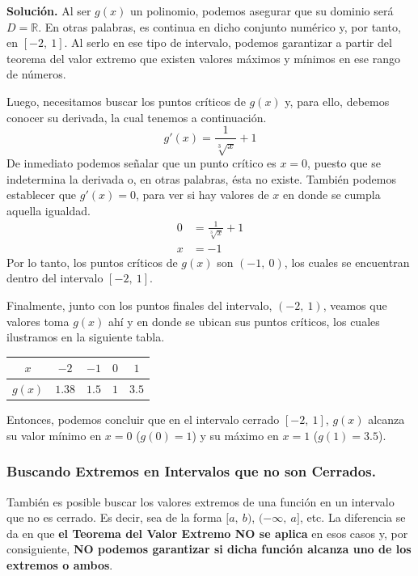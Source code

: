 \documentclass[12pt]{article}
\begin{document}
\textbf{Solución.} \quad Al ser $g(x)$ un polinomio, podemos asegurar que su dominio será $D = \mathbb{R}$. En otras palabras, es continua en dicho conjunto numérico y, por tanto, en $[-2, \ 1]$. Al serlo en ese tipo de intervalo, podemos garantizar a partir del teorema del valor extremo que existen valores máximos y mínimos en ese rango de números.

Luego, necesitamos buscar los puntos críticos de $g(x)$ y, para ello, debemos conocer su derivada, la cual tenemos a continuación.
\[
	g'(x) = \frac{1}{\sqrt[3]{x}} + 1
\]
De inmediato podemos señalar que un punto crítico es $x = 0$, puesto que se indetermina la derivada o, en otras palabras, ésta no existe. También podemos establecer que $g'(x) = 0$, para ver si hay valores de $x$ en donde se cumpla aquella igualdad.
\begin{align*}
	0 &= \frac{1}{\sqrt[3]{x}} + 1 \\
	x &= -1
\end{align*}
Por lo tanto, los puntos críticos de $g(x)$ son $(-1, \ 0)$, los cuales se encuentran dentro del intervalo $[-2, \ 1]$.

Finalmente, junto con los puntos finales del intervalo, $(-2, \ 1)$, veamos que valores toma $g(x)$ ahí y en donde se ubican sus puntos críticos, los cuales ilustramos en la siguiente tabla.

\begin{table}[hbt!]
\centering

\begin{tabular}{c | c c c c}
$x$ & $-2$ & $-1$ & $0$ & $1$ \\
\hline
$g(x)$ & $1.38$ & $1.5$ & $1$ & $3.5$
\end{tabular}

\end{table}

Entonces, podemos concluir que en el intervalo cerrado $[-2, \ 1]$, $g(x)$ alcanza su valor mínimo en $x = 0$ ($g(0) = 1$) y su máximo en $x = 1$ ($g(1) = 3.5$).



\subsubsection{Buscando Extremos en Intervalos que no son Cerrados.}

También es posible buscar los valores extremos de una función en un intervalo que no es cerrado. Es decir, sea de la forma $[a, \ b)$, $(-\infty, \ a]$, etc. La diferencia se da en que \textbf{el Teorema del Valor Extremo NO se aplica} en esos casos y, por consiguiente, \textbf{NO podemos garantizar si dicha función alcanza uno de los extremos o ambos}.
\end{document}
